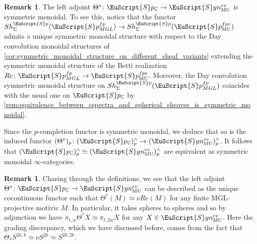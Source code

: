 \documentclass[oneside,a4paper]{amsart}
\newcommand{\euscr}[1]{\EuScript{#1}} %
\newcommand{\MU}{\mathrm{MU}} %
\newcommand{\MGL}{\mathrm{MGL}} %
\newcommand{\spectra}{\euscr{S}p} %
\newcommand{\cspectra}{\euscr{S}p_{\mathbb{C}}} %
\newcommand{\synspectra}{\euscr{S}yn} %
\newcommand{\pcomplete}{^{\wedge} _{p}} %
\newcommand{\spectramglfp}{\spectra_{MGL}^{fp}} %
\newcommand{\spectramufpe}{\spectra_{\MU}^{fpe}} %
\theoremstyle{plain}
\theoremstyle{definition}
\newtheorem{rem}[thm]{Remark}
\theoremstyle{remark}
\begin{document}
\begin{rem}
The left adjoint $\Theta^{*} \colon \cspectra \rightarrow \synspectra_{\MU}^{ev}$ is symmetric monoidal. To see this, notice that the functor $Sh_{\Sigma}^{\spectra}(\spectramglfp) \rightarrow Sh_{\Sigma}^{\spectra}(\spectramufpe)$ admits a unique symmetric monoidal structure with respect to the Day convolution monoidal structures of \cref{cor:symmetric_monoidal_structure_on_different_sheaf_variants} extending the symmetric monoidal structure of the Betti realization $Re \colon \spectramglfp \rightarrow \spectramufpe$. Moreover, the Day convolution symmetric monoidal structure on $Sh_{\Sigma}^{\spectra}(\spectramglfp)$ coincides with the usual one on $\cspectra$ by \cref{rem:equivalence_between_cspectra_and_spherical_sheaves_is_symmetric_monoidal}.

Since the $p$-completion functor is symmetric monoidal, we deduce that so is the induced functor $(\Theta^{*})_{p} \colon (\cspectra) \pcomplete \rightarrow (\synspectra_{\MU}^{ev}) \pcomplete$. It follows that $(\cspectra) \pcomplete \simeq (\synspectra_{\MU}^{ev}) \pcomplete$ are equivalent as symmetric monoidal $\infty$-categories. 
\end{rem}

\begin{rem}
\label{rem:action_of_the_left_adjoint_between_motivic_and_synthetic_on_finite_mgl_projectives}
Chasing through the definitions, we see that the left adjoint $\Theta^{*} \colon \cspectra \rightarrow \synspectra_{\MU}^{ev}$ can be described as the unique cocontinuous functor such that $\Theta^{*}(M) \simeq \nu Re(M)$ for any finite $\MGL$-projective motivic $M$. In particular, it takes spheres to spheres and so by adjunction we have $\pi_{t, w} \Theta^{*} X \simeq \pi_{t, 2w} X$ for any $X \in \synspectra_{\MU}^{ev}$. Here the grading discrepancy, which we have discussed before, comes from the fact that $\Theta_{*} S^{2k, k} \simeq \nu S^{2k} \simeq S^{2k, 2k}$. 
\end{rem}
\end{document}
